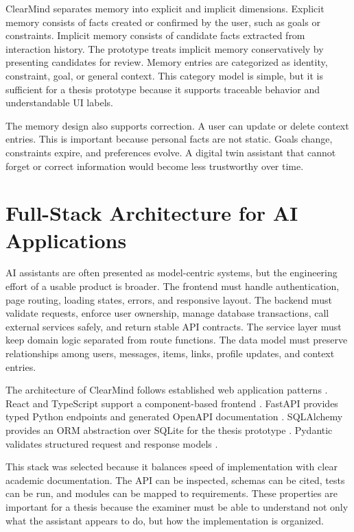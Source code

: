 ClearMind separates memory into explicit and implicit dimensions. Explicit memory consists of facts created or confirmed by the user, such as goals or constraints. Implicit memory consists of candidate facts extracted from interaction history. The prototype treats implicit memory conservatively by presenting candidates for review. Memory entries are categorized as identity, constraint, goal, or general context. This category model is simple, but it is sufficient for a thesis prototype because it supports traceable behavior and understandable UI labels.

The memory design also supports correction. A user can update or delete context entries. This is important because personal facts are not static. Goals change, constraints expire, and preferences evolve. A digital twin assistant that cannot forget or correct information would become less trustworthy over time.

\section{Full-Stack Architecture for AI Applications}

AI assistants are often presented as model-centric systems, but the engineering effort of a usable product is broader. The frontend must handle authentication, page routing, loading states, errors, and responsive layout. The backend must validate requests, enforce user ownership, manage database transactions, call external services safely, and return stable API contracts. The service layer must keep domain logic separated from route functions. The data model must preserve relationships among users, messages, items, links, profile updates, and context entries.

The architecture of ClearMind follows established web application patterns \cite{martin2017clean,fowler2002patterns}. React and TypeScript support a component-based frontend \cite{react,typescript}. FastAPI provides typed Python endpoints and generated OpenAPI documentation \cite{fastapi,openapi}. SQLAlchemy provides an ORM abstraction over SQLite for the thesis prototype \cite{sqlalchemy}. Pydantic validates structured request and response models \cite{pydantic}.

This stack was selected because it balances speed of implementation with clear academic documentation. The API can be inspected, schemas can be cited, tests can be run, and modules can be mapped to requirements. These properties are important for a thesis because the examiner must be able to understand not only what the assistant appears to do, but how the implementation is organized.


